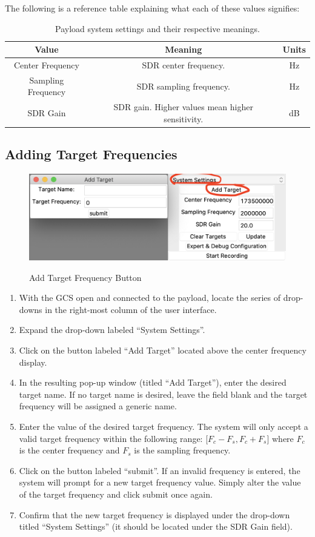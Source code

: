 \documentclass{report}
\begin{document}
			The following is a reference table explaining what each of these values signifies:
			\begin{table}[htb]
			\centering
			\caption{Payload system settings and their respective meanings.}
			\begin{tabular}{||c c c||}
			\hline
			Value & Meaning & Units\\ [0.5ex]
			\hline\hline
			Center Frequency & SDR center frequency. & Hz \\
			\hline
			Sampling Frequency & SDR sampling frequency. & Hz \\
			\hline
			SDR Gain & SDR gain. Higher values mean higher sensitivity. & dB \\ [1ex]
			\hline
			\end{tabular}
			\end{table}
		\subsection{Adding Target Frequencies}
			\begin{figure}[htb]
				\centering
				\caption{Add Target Frequency Button}
				\includegraphics[scale=0.5]{add_target_btn.jpg}
				\label{fig:add_target_btn}
			\end{figure}
			\begin{enumerate}
				\item With the GCS open and connected to the payload, locate the series of drop-downs in the right-most column of the user interface.
				\item Expand the drop-down labeled ``System Settings''.
				\item Click on the button labeled ``Add Target'' located above the center frequency display.
				\item In the resulting pop-up window (titled ``Add Target''), enter the desired target name. If no target name is desired, leave the field blank and the target frequency will be assigned a generic name.
				\item Enter the value of the desired target frequency. The system will only accept a valid target frequency within the following range: [$F_c - F_s , F_c + F_s$] where $F_c$ is the center frequency and $F_s$ is the sampling frequency. 
				\item Click on the button labeled ``submit''. If an invalid frequency is entered, the system will prompt for a new target frequency value. Simply alter the value of the target frequency and click submit once again.
				\item Confirm that the new target frequency is displayed under the drop-down titled ``System Settings'' (it should be located under the SDR Gain field).
			\end{enumerate}
\end{document}
